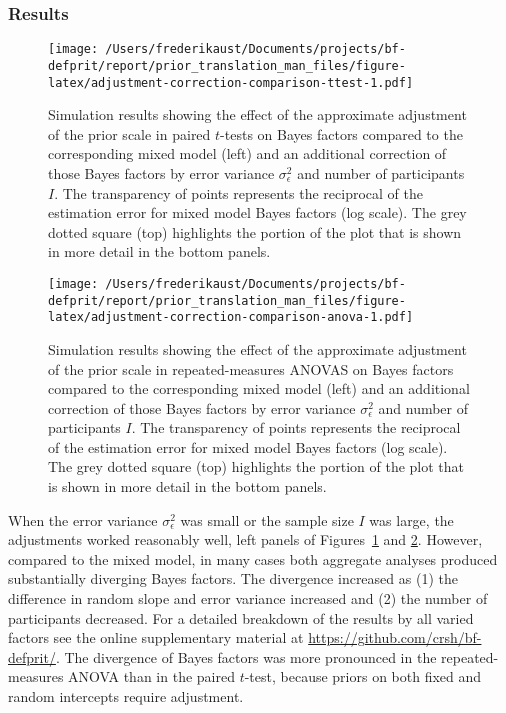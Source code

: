 \documentclass[
  man,floatsintext,draftall]{apa6}
\begin{document}
\hypertarget{results-1}{%
\subsubsection{Results}\label{results-1}}



\begin{figure}
\centering
\texttt{[image: /Users/frederikaust/Documents/projects/bf-defprit/report/prior\_translation\_man\_files/figure-latex/adjustment-correction-comparison-ttest-1.pdf]}
\caption{\label{fig:adjustment-correction-comparison-ttest}Simulation results showing the effect of the approximate adjustment of the prior scale in paired \(t\)-tests on Bayes factors compared to the corresponding mixed model (left) and an additional correction of those Bayes factors by error variance \(\sigma_\epsilon^2\) and number of participants \(I\). The transparency of points represents the reciprocal of the estimation error for mixed model Bayes factors (log scale). The grey dotted square (top) highlights the portion of the plot that is shown in more detail in the bottom panels.}
\end{figure}



\begin{figure}
\centering
\texttt{[image: /Users/frederikaust/Documents/projects/bf-defprit/report/prior\_translation\_man\_files/figure-latex/adjustment-correction-comparison-anova-1.pdf]}
\caption{\label{fig:adjustment-correction-comparison-anova}Simulation results showing the effect of the approximate adjustment of the prior scale in repeated-measures ANOVAS on Bayes factors compared to the corresponding mixed model (left) and an additional correction of those Bayes factors by error variance \(\sigma_\epsilon^2\) and number of participants \(I\). The transparency of points represents the reciprocal of the estimation error for mixed model Bayes factors (log scale). The grey dotted square (top) highlights the portion of the plot that is shown in more detail in the bottom panels.}
\end{figure}

When the error variance \(\sigma_\epsilon^2\) was small or the sample size \(I\) was large, the adjustments worked reasonably well, left panels of Figures~\ref{fig:adjustment-correction-comparison-ttest} and \ref{fig:adjustment-correction-comparison-anova}.
However, compared to the mixed model, in many cases both aggregate analyses produced substantially diverging Bayes factors.
The divergence increased as (1) the difference in random slope and error variance increased and (2) the number of participants decreased.
For a detailed breakdown of the results by all varied factors see the online supplementary material at \url{https://github.com/crsh/bf-defprit/}.
The divergence of Bayes factors was more pronounced in the repeated-measures ANOVA than in the paired \(t\)-test, because priors on both fixed and random intercepts require adjustment.
\end{document}
